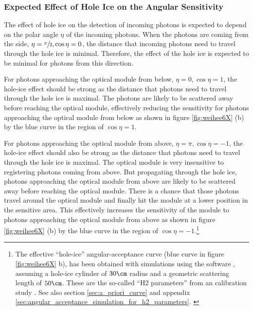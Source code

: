\FloatBarrier
\subsubsection{Expected Effect of Hole Ice on the Angular Sensitivity}
\label{sec:hole_ice_effects}

The effect of hole ice on the detection of incoming photons is expected to depend on the polar angle $\eta$ of the incoming photons. \cite{icepaper} When the photons are coming from the side, $\eta = \sfrac{\pi}{2}, \cos \eta = 0$, the distance that incoming photons need to travel through the hole ice is minimal. Therefore, the effect of the hole ice is expected to be minimal for photons from this direction.

For photons approaching the optical module from below, $\eta = 0, \cos \eta = 1$, the hole-ice effect should be strong as the distance that photons need to travel through the hole ice is maximal. The photons are likely to be scattered away before reaching the optical module, effectively reducing the sensitivity for photons approaching the optical module from below as shown in figure \ref{fig:weihee6X} (b) by the blue curve in the region of $\cos \eta = 1$.

For photons approaching the optical module from above, $\eta = \pi, \cos \eta = -1$, the hole-ice effect should also be strong as the distance that photons need to travel through the hole ice is maximal. The optical module is very insensitive to registering photons coming from above. But propagating through the hole ice, photons approaching the optical module from above are likely to be scattered away before reaching the optical module. There is a chance that those photons travel around the optical module and finally hit the module at a lower position in the sensitive area. This effectively increases the sensitivity of the module to photons approaching the optical module from above as shown in figure \ref{fig:weihee6X} (b) by the blue curve in the region of $\cos \eta = -1$.\footnote{The effective ``hole-ice'' angular-acceptance curve (blue curve in figure \ref{fig:weihee6X} b), has been obtained with simulations using the  software \cite{lundberg}, assuming a hole-ice cylinder of $30\cm$ radius and a geometric scattering length of $50\cm$. These are the so-called ``H2 parameters'' from an  calibration study \cite{holeicestudieswithyag,icemodelsdata}. See also section \ref{sec:a_priori_curve} and appendix \ref{sec:angular_acceptance_simulation_for_h2_parameters}. \label{footnote:hole_ice_h2_curve}}

